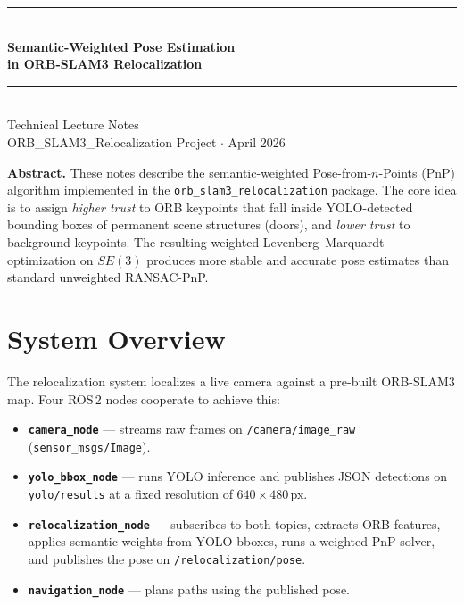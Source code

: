 \documentclass[12pt,a4paper]{article}
\begin{document}

\begin{titlepage}
\centering
\vspace*{2cm}
{\color{hdrblue}\rule{\linewidth}{1.5pt}}\\[0.6em]
{\LARGE\bfseries\color{hdrblue} Semantic-Weighted Pose Estimation\\[0.4em]
 in ORB-SLAM3 Relocalization}\\[0.4em]
{\color{hdrblue}\rule{\linewidth}{1.5pt}}\\[1.5em]
{\large Technical Lecture Notes}\\[0.5em]
{\normalsize ORB\_SLAM3\_Relocalization Project $\cdot$ April 2026}
\vspace{2cm}

\begin{tcolorbox}[colback=boxblue, colframe=hdrblue, arc=6pt, boxrule=1pt]
\textbf{Abstract.}\;
These notes describe the semantic-weighted Pose-from-$n$-Points (PnP) algorithm
implemented in the \texttt{orb\_slam3\_relocalization} package. The core idea is to
assign \emph{higher trust} to ORB keypoints that fall inside YOLO-detected bounding
boxes of permanent scene structures (doors), and \emph{lower trust} to background
keypoints. The resulting weighted Levenberg--Marquardt optimization on $SE(3)$
produces more stable and accurate pose estimates than standard unweighted RANSAC-PnP.
\end{tcolorbox}
\end{titlepage}

\tableofcontents
\newpage

\section{System Overview}

The relocalization system localizes a live camera against a pre-built ORB-SLAM3 map.
Four ROS\,2 nodes cooperate to achieve this:

\begin{itemize}[noitemsep]
  \item \textbf{\texttt{camera\_node}} --- streams raw frames on
        \texttt{/camera/image\_raw} (\texttt{sensor\_msgs/Image}).
  \item \textbf{\texttt{yolo\_bbox\_node}} --- runs YOLO inference and publishes JSON
        detections on \texttt{yolo/results} at a fixed resolution of
        $640\times480$\,px.
  \item \textbf{\texttt{relocalization\_node}} --- subscribes to both topics, extracts
        ORB features, applies semantic weights from YOLO bboxes, runs a weighted PnP
        solver, and publishes the pose on \texttt{/relocalization/pose}.
  \item \textbf{\texttt{navigation\_node}} --- plans paths using the published pose.
\end{itemize}
\end{document}
